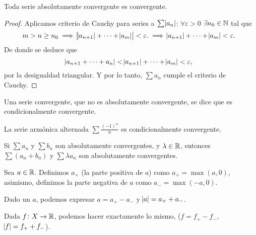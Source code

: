 \begin{prop}
  Toda serie absolutamente convergente es convergente.
\end{prop}

\begin{proof}
  Aplicamos criterio de Cauchy para series a $\sum \abs{a_n}$: $\forall \varepsilon > 0$ $\exists n_0 \in \mathbb{N}$
  tal que
  \[
    m > n \geq n_0 \implies \abs{\abs{a_{n+1}} + \cdots + \abs{a_m}} < \varepsilon .\implies
    \abs{a_{n+1}} + \cdots + \abs{a_m} < \varepsilon.
  \]
  De donde se deduce que
  \[
    \abs{a_{n+1} + \cdots + a_n} < \abs{a_{n+1}} + \cdots + \abs{a_m} < \varepsilon,
  \]
  por la desigualdad triangular. Y por lo tanto, $\sum a_n$ cumple el criterio de Cauchy.

\end{proof}

\begin{defi}
  Una serie convergente, que no es absolutamente convergente, se dice que es condicionalmente convergente.
\end{defi}

\begin{example*}
  La serie armónica alternada $\sum \frac{(-1)^n}{n}$ es condicionalmente convergente.
\end{example*}

\begin{prop}
    Si $\sum a_n$ y $\sum b_n$ son absolutamente convergentes, y $\lambda \in \mathbb{R}$,
    entonces $\sum (a_n + b_n)$ y $\sum \lambda a_n$ son absolutamente convergentes.
\end{prop}

\begin{defi}
  Sea $a \in \mathbb{R}$. Definimos $a_+$ (la parte positiva de $a$) como $a_+ = \max(a, 0)$, asimismo, definimos
  la parte negativa de $a$ como $a_- = \max(-a,0)$.
\end{defi}

\begin{obs*}
  Dado un $a$, podemos expresar $a = a_+ - a_-$ y $\abs{a} = a_+ + a_-$.
\end{obs*}

\begin{obs*}
  Dada $f \colon X \to \mathbb{R}$, podemos hacer exactamente lo mismo, ($f = f_+ - f_-$, $\abs{f} = f_+ + f_-$).
\end{obs*}

